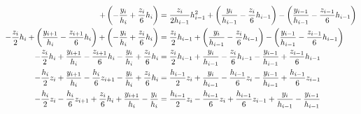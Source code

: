 \documentclass[letterpaper, 10pt, titlepage]{article}
\newcommand{\pp}{\paren}
\begin{document}
\begin{equation}
\begin{aligned}
        + \pp{-\dfrac{y_i}{h_i}
        +
        \dfrac{z_{i}}{6}h_i}
        &=
        \dfrac{z_{i}}{2h_{i-1}}h_{i-1}^2
        + \pp{
            \dfrac{y_{i}}{h_{i-1}}
            - \dfrac{z_{i}}{6}h_{i-1}
        }
        -
        \pp{
            \dfrac{y_{i-1}}{h_{i-1}}
            - \dfrac{z_{i-1}}{6}h_{i-1}
        }
        \\
        - \dfrac{z_{i}}{2}h_i
        + \pp{
            \dfrac{y_{i+1}}{h_i}
            - \dfrac{z_{i+1}}{6}h_i
            }
        + \pp{-\dfrac{y_i}{h_i}
        + \dfrac{z_{i}}{6}h_i}
        &=
        \dfrac{z_{i}}{2}h_{i-1}
        +
        \pp{
            \dfrac{y_{i}}{h_{i-1}}
            - \dfrac{z_{i}}{6}h_{i-1}
        }
        -
        \pp{
            \dfrac{y_{i-1}}{h_{i-1}}
            - \dfrac{z_{i-1}}{6}h_{i-1}
        }
        \\
        - \dfrac{z_{i}}{2}h_i
        +
            \dfrac{y_{i+1}}{h_i}
            - \dfrac{z_{i+1}}{6}h_i
        - \dfrac{y_i}{h_i}
        + \dfrac{z_{i}}{6}h_i
        &=
        \dfrac{z_{i}}{2}h_{i-1}
        +
            \dfrac{y_{i}}{h_{i-1}}
            - \dfrac{z_{i}}{6}h_{i-1}
            - \dfrac{y_{i-1}}{h_{i-1}}
            + \dfrac{z_{i-1}}{6}h_{i-1}
        \\
        - \dfrac{h_{i}}{2}z_i
        +
            \dfrac{y_{i+1}}{h_i}
            - \dfrac{h_{i}}{6}z_{i+1}
        - \dfrac{y_{i}}{h_i}
        + \dfrac{z_{i}}{6}h_i
        &=
        \dfrac{h_{i-1}}{2}z_{i}
        +
            \dfrac{y_{i}}{h_{i-1}}
            - \dfrac{h_{i-1}}{6}z_{i}
            - \dfrac{y_{i-1}}{h_{i-1}}
            + \dfrac{h_{i-1}}{6}z_{i-1}
        \\
        - \dfrac{h_{i}}{2}z_i
        - \dfrac{h_{i}}{6}z_{i+1}
        + \dfrac{z_{i}}{6}h_i
        + \dfrac{y_{i+1}}{h_i}
        - \dfrac{y_i}{h_i}
        &=
        \dfrac{h_{i-1}}{2}z_{i}
        - \dfrac{h_{i-1}}{6}z_{i}
        + \dfrac{h_{i-1}}{6}z_{i-1}
        + \dfrac{y_{i}}{h_{i-1}}
        - \dfrac{y_{i-1}}{h_{i-1}}
        \\
    \end{aligned}
\end{equation}
\end{document}
